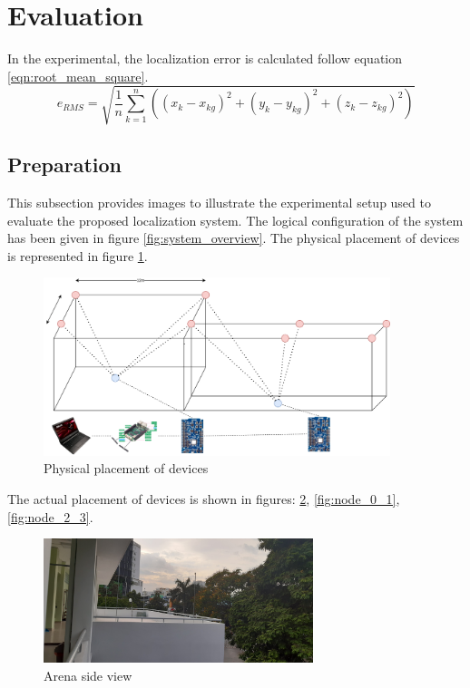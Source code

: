 \documentclass[\main/main.tex]{subfiles}
\begin{document}
\section{Evaluation}

In the experimental, the localization error is calculated follow equation \ref{eqn:root_mean_square}.
\begin{equation}
    e_{RMS} = \sqrt{\frac{1}{n} \sum_{k=1}^{n} ((x_k-x_{kg})^2 + (y_k-y_{kg})^2 + (z_k-z_{kg})^2)}
    \label{eqn:root_mean_square}
\end{equation}

\subsection{Preparation}
This subsection provides images to illustrate the experimental setup used to evaluate the proposed localization system. The logical configuration of the system has been given in figure \ref{fig:system_overview}. The physical placement of devices is represented in figure \ref{fig:physical placement of devices}.

\begin{figure}[H]     
    \centering
    \includegraphics[width=0.9\textwidth]{system_overview_phy.png}
    \caption{Physical placement of devices}
    \label{fig:physical placement of devices}
\end{figure}
The actual placement of devices is shown in figures: \ref{fig:arena_00}, \ref{fig:node_0_1}, \ref{fig:node_2_3}.

\begin{figure}[H]      
    \centering
    \includegraphics[width=0.7\textwidth]{arena_00.jpg}
    \caption{Arena side view}
    \label{fig:arena_00}
\end{figure}
\end{document}
